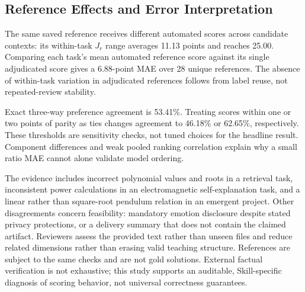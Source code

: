 \subsection{Reference Effects and Error Interpretation}

The same saved reference receives different automated scores across
candidate contexts: its within-task $J_r$ range averages 11.13 points and
reaches 25.00. Comparing each task's mean automated reference score against
its single adjudicated score gives a 6.88-point MAE over 28 unique references.
The absence of within-task variation in adjudicated references follows
from label reuse, not repeated-review stability.

Exact three-way preference agreement is 53.41\%. Treating scores within
one or two points of parity as ties changes agreement to 46.18\% or
62.65\%, respectively. These thresholds are sensitivity checks, not tuned
choices for the headline result. Component differences and weak pooled
ranking correlation explain why a small ratio MAE cannot alone validate
model ordering.

The evidence includes incorrect polynomial values and roots in a retrieval
task, inconsistent power calculations in an electromagnetic self-explanation
task, and a linear rather than square-root pendulum relation in an emergent
project. Other disagreements concern feasibility: mandatory emotion disclosure
despite stated privacy protections, or a delivery summary that does not
contain the claimed artifact. Reviewers assess the provided text rather
than unseen files and reduce related dimensions rather than erasing valid
teaching structure. References are subject to the same checks and are not
gold solutions. External factual verification is not exhaustive; this
study supports an auditable, Skill-specific diagnosis of scoring behavior,
not universal correctness guarantees.
